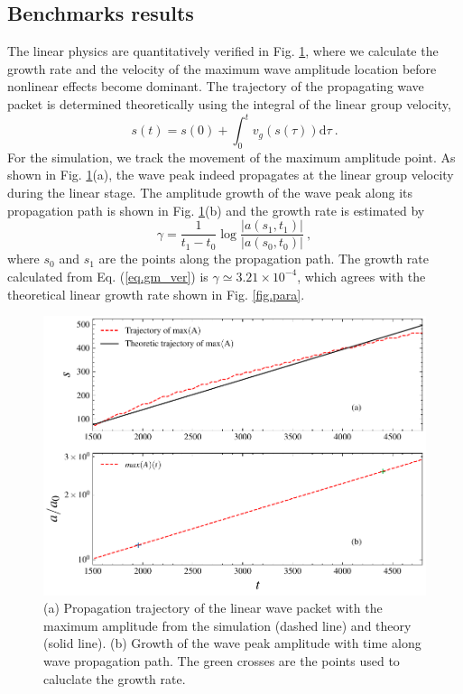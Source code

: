 \subsection{Benchmarks results}
The linear physics are quantitatively verified in Fig. \ref{fig.linear}, where we calculate the growth rate and the velocity of the maximum wave amplitude location before nonlinear effects become dominant.
  The trajectory of the propagating wave packet is determined theoretically using the integral of the linear group velocity,
\begin{equation}
    s(t) = s(0) + \int_0^{t} v_g(s(\tau)) \mathrm{d} \tau~.
\end{equation}
For the simulation,
 we track the movement of the maximum amplitude point. 
 As shown in Fig. \ref{fig.linear}(a), 
 the wave peak indeed propagates at the linear group velocity during the linear stage.
 The 
 amplitude growth of the wave peak along its propagation path
is shown in Fig. \ref{fig.linear}(b)
and 
 the growth rate is estimated by \cite{nogi2022}
\begin{equation}\label{eq.gm_ver}
        \gamma = \frac{1}{t_1-t_0}\log\frac{|a(s_1,t_1)|}{|a(s_0,t_0)|}~,
\end{equation}
where $s_0$ and $s_1$ are the points along the propagation path.
The  growth rate calculated from Eq. (\ref{eq.gm_ver}) is $\gamma \simeq 3.21\times10^{-4}$, which agrees with the theoretical linear growth rate shown in Fig. \ref{fig.para}.
\begin{figure}[htbp]
    \centering
    \includegraphics[scale=0.5]{cpc_img/fig_linear.pdf}
    \caption{ (a) Propagation trajectory of the linear wave packet with the maximum amplitude from the simulation (dashed line) and theory (solid line).  (b)  Growth of the wave peak amplitude with time along wave propagation path. The green crosses are the points used to caluclate the growth rate.}
    \label{fig.linear}
\end{figure}

